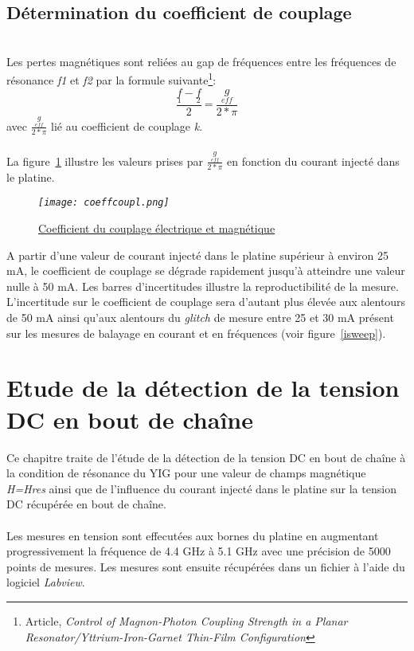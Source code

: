 \documentclass[12pt,fleqn]{book} %
\begin{document}
\section{Détermination du coefficient de couplage}
~\\\noindent Les pertes magnétiques sont reliées au gap de fréquences entre les fréquences de résonance \emph{f1} et \emph{f2} par la formule suivante\footnote{Article, \emph{Control of Magnon-Photon Coupling Strength in a Planar Resonator/Yttrium-Iron-Garnet Thin-Film Configuration}}: 
$$\frac{\underset{1}{f}-\underset{2}{f}}{2}\ \text{=}\ \frac{\underset{eff}{g}}{2*\pi}$$
avec $\frac{\underset{eff}{g}}{2*\pi}$ lié au coefficient de couplage \emph{k}.
~\\\\La figure~\underline{\color{blue}\ref{coeffcoupl}} illustre les valeurs prises par $\frac{\underset{eff}{g}}{2*\pi}$ en fonction du courant injecté dans le platine.
\begin{figure}[H]
	\centering
	\itshape
	\texttt{[image: coeffcoupl.png]}
	\caption{\label{coeffcoupl} \underline{Coefficient du couplage électrique et magnétique}}
\end{figure}
\noindent A partir d'une valeur de courant injecté dans le platine supérieur à environ 25 mA, le coefficient de couplage se dégrade rapidement jusqu'à atteindre une valeur nulle à 50 mA. Les barres d'incertitudes illustre la reproductibilité de la mesure. L'incertitude sur le coefficient de couplage sera d'autant plus élevée aux alentours de 50 mA ainsi qu'aux alentours du \emph{glitch} de mesure entre 25 et 30 mA présent sur les mesures de balayage en courant et en fréquences (voir figure~\underline{\color{blue}\ref{isweep}}).

\chapter{Etude de la détection de la tension DC en bout de chaîne}
Ce chapitre traite de l'étude de la détection de la tension DC en bout de chaîne à la condition de résonance du YIG pour une valeur de champs magnétique \emph{H=Hres} ainsi que de l'influence du courant injecté dans le platine sur la tension DC récupérée en bout de chaîne.
~\\\\ Les mesures en tension sont effecutées aux bornes du platine en augmentant progressivement la fréquence de 4.4 GHz à 5.1 GHz avec une précision de 5000 points de mesures. Les mesures sont ensuite récupérées dans un fichier à l'aide du logiciel \emph{Labview}.
\end{document}

